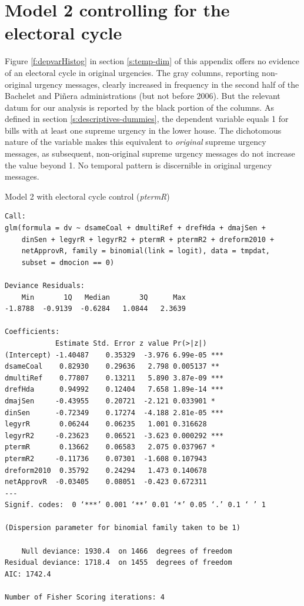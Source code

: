 \documentclass[letter,12pt]{article}
\begin{document}
\section{Model 2 controlling for the electoral cycle}

Figure \ref{f:depvarHistog} in section \ref{s:temp-dim} of this appendix offers no evidence of an electoral cycle in original urgencies. The gray columns, reporting non-original urgency messages, clearly increased in frequency in the second half of the Bachelet and Piñera administrations (but not before 2006). But the relevant datum for our analysis is reported by the black portion of the columns. As defined in section \ref{s:descriptives-dummies}, the dependent variable equals 1 for bills with at least one supreme urgency in the lower house. The dichotomous nature of the variable makes this equivalent to \emph{original} supreme urgency messages, as subsequent, non-original supreme urgency messages do not increase the value beyond 1. No temporal pattern is discernible in original urgency messages.

\begin{table}
  \begin{footnotesize}
\caption{Model 2 with electoral cycle control (\emph{ptermR})}\label{t:m2elect}
\centering
\begin{verbatim}
Call:
glm(formula = dv ~ dsameCoal + dmultiRef + drefHda + dmajSen + 
    dinSen + legyrR + legyrR2 + ptermR + ptermR2 + dreform2010 + 
    netApprovR, family = binomial(link = logit), data = tmpdat, 
    subset = dmocion == 0)

Deviance Residuals: 
    Min       1Q   Median       3Q      Max  
-1.8788  -0.9139  -0.6284   1.0844   2.3639  

Coefficients:
            Estimate Std. Error z value Pr(>|z|)    
(Intercept) -1.40487    0.35329  -3.976 6.99e-05 ***
dsameCoal    0.82930    0.29636   2.798 0.005137 ** 
dmultiRef    0.77807    0.13211   5.890 3.87e-09 ***
drefHda      0.94992    0.12404   7.658 1.89e-14 ***
dmajSen     -0.43955    0.20721  -2.121 0.033901 *  
dinSen      -0.72349    0.17274  -4.188 2.81e-05 ***
legyrR       0.06244    0.06235   1.001 0.316628    
legyrR2     -0.23623    0.06521  -3.623 0.000292 ***
ptermR       0.13662    0.06583   2.075 0.037967 *  
ptermR2     -0.11736    0.07301  -1.608 0.107943    
dreform2010  0.35792    0.24294   1.473 0.140678    
netApprovR  -0.03405    0.08051  -0.423 0.672311    
---
Signif. codes:  0 ‘***’ 0.001 ‘**’ 0.01 ‘*’ 0.05 ‘.’ 0.1 ‘ ’ 1

(Dispersion parameter for binomial family taken to be 1)

    Null deviance: 1930.4  on 1466  degrees of freedom
Residual deviance: 1718.4  on 1455  degrees of freedom
AIC: 1742.4

Number of Fisher Scoring iterations: 4
\end{verbatim}
\end{footnotesize}
\end{table}
\end{document}
